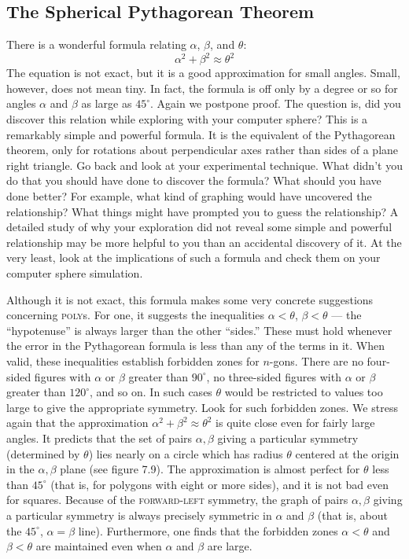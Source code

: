 \documentclass{book}
\begin{document}
\subsection{The Spherical Pythagorean Theorem}

There is a wonderful formula relating $\alpha$, $\beta$, and $\theta$:
$$\alpha^2 + \beta^2 \approx \theta^2$$
The equation is not exact, but it is a good approximation for small
angles. Small, however, does not mean tiny. In fact, the formula is off
only by a degree or so for angles $\alpha$ and $\beta$ as large as $45^{\circ}$. Again we
postpone proof. The question is, did you discover this relation while
exploring with your computer sphere? This is a remarkably simple and
powerful formula. It is the equivalent of the Pythagorean theorem, only
for rotations about perpendicular axes rather than sides of a plane right
triangle. Go back and look at your experimental technique. What didn't
you do that you should have done to discover the formula? What should
you have done better? For example, what kind of graphing would have
uncovered the relationship? What things might have prompted you to
guess the relationship? A detailed study of why your exploration did
not reveal some simple and powerful relationship may be more helpful
to you than an accidental discovery of it. At the very least, look at the
implications of such a formula and check them on your computer sphere
simulation.

Although it is not exact, this formula makes some very concrete
suggestions concerning \textsc{poly}s. For one, it suggests the inequalities $\alpha <
\theta$, $\beta < \theta$ --- the ``hypotenuse'' is always larger than the other ``sides.''
These must hold whenever the error in the Pythagorean formula is less
than any of the terms in it. When valid, these inequalities establish
forbidden zones for $n$-gons. There are no four-sided figures with $\alpha$ or $\beta$
greater than $90^{\circ}$, no three-sided figures with $\alpha$ or $\beta$ greater than $120^{\circ}$,
and so on. In such cases $\theta$ would be restricted to values too large to give
the appropriate symmetry. Look for such forbidden zones.
We stress again that the approximation $\alpha^2 +  \beta^2 \approx \theta^2$ is quite close
even for fairly large angles. It predicts that the set of pairs $\alpha, \beta$ giving
a particular symmetry (determined by $\theta$) lies nearly on a circle which
has radius $\theta$ centered at the origin in the $\alpha, \beta$ plane (see figure 7.9). The
approximation is almost perfect for $\theta$ less than $45^{\circ}$ (that is, for polygons
with eight or more sides), and it is not bad even for squares. Because of
the \textsc{forward}-\textsc{left} symmetry, the graph of pairs $\alpha , \beta$ giving a particular
symmetry is always precisely symmetric in $\alpha$ and $\beta$ (that is, about the
$45^{\circ}$, $\alpha = \beta$ line). Furthermore, one finds that the forbidden zones $\alpha < \theta$
and $\beta < \theta$ are maintained even when $\alpha$ and $\beta$ are large.
\end{document}
